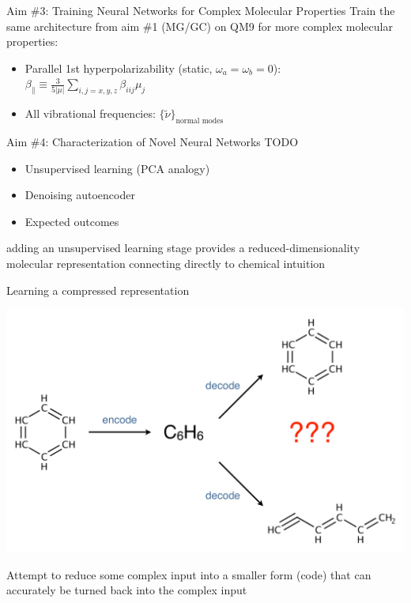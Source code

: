\documentclass[xetex,compress]{beamer}
\begin{document}

\begin{frame}{Aim \#3: Training Neural Networks for Complex Molecular Properties}
  Train the same architecture from aim \#1 (MG/GC) on QM9 for more complex molecular properties:
  \begin{itemize}
  \item Parallel 1st hyperpolarizability (static, \(\omega_{a} = \omega_{b} = 0\)): \(\beta_{\parallel} \equiv \frac{3}{5|\mu|} \sum_{i,j=x,y,z} \beta_{iij} \mu_{j}\)
  \item All vibrational frequencies: \(\{\tilde{\nu}\}_{\text{normal modes}}\)
  \end{itemize}
\end{frame}

\begin{frame}{Aim \#4: Characterization of Novel Neural Networks}
  TODO
  \begin{itemize}
  \item Unsupervised learning (PCA analogy)
  \item Denoising autoencoder
  \item Expected outcomes
  \end{itemize}
  adding an unsupervised learning stage provides a reduced-dimensionality molecular representation connecting directly to chemical intuition
\end{frame}

\begin{frame}{Learning a compressed representation}
  \begin{center}
    \includegraphics[width=1.00\textwidth]{./figures/autoencoder_example.pdf}
  \end{center}
  Attempt to reduce some complex input into a smaller form (code) that can accurately be turned back into the complex input
\end{frame}
\end{document}
